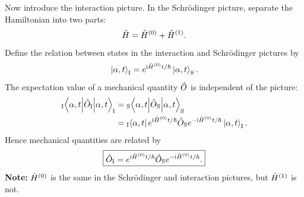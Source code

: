 Now introduce the interaction picture. In the Schr\"odinger picture, separate the Hamiltonian into two parts:
\begin{equation}
 \hat{H}=\hat{H}^{(0)}+\hat{H}^{(1)}.
\end{equation}
Define the relation between states in the interaction and Schr\"odinger pictures by
\begin{equation}
 \left|\alpha,t\right\rangle_{\mathrm I}
 =e^{\mathrm{i}\hat{H}^{(0)}t/\hbar}\left|\alpha,t\right\rangle_{\mathrm S}.
\end{equation}
The expectation value of a mechanical quantity $\hat{O}$ is independent of the picture:
\begin{equation}\begin{aligned}
 {}_{\mathrm I}\!\left\langle\alpha,t\middle|\hat{O}_{\mathrm I}\middle|\alpha,t\right\rangle_{\mathrm I}
 &={}_{\mathrm S}\!\left\langle\alpha,t\middle|\hat{O}_{\mathrm S}\middle|\alpha,t\right\rangle_{\mathrm S}\\
 &={}_{\mathrm I}\!\left\langle\alpha,t\right|e^{\mathrm{i}\hat{H}^{(0)}t/\hbar}
 \hat{O}_{\mathrm S}e^{-\mathrm{i}\hat{H}^{(0)}t/\hbar}\left|\alpha,t\right\rangle_{\mathrm I}.
\end{aligned}\end{equation}
Hence mechanical quantities are related by
\begin{equation}
 \boxed{\hat{O}_{\mathrm I}
 =e^{\mathrm{i}\hat{H}^{(0)}t/\hbar}\hat{O}_{\mathrm S}
 e^{-\mathrm{i}\hat{H}^{(0)}t/\hbar}.}
\end{equation}
\textbf{Note:} $\hat{H}^{(0)}$ is the same in the Schr\"odinger and interaction pictures, but $\hat{H}^{(1)}$ is not.

